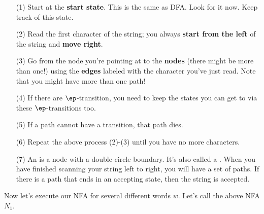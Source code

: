 \begin{itemize}
  \item[(1)] Start at the \textbf{start state}.
   This is the same as DFA. Look for it now. Keep track of this
   state.
 \item[(2)] Read the first character of the string; you always
 \textbf{start from the left} of the string and
 \textbf{move right}.
 \item[(3)] Go from the node you're pointing at to the
 \textbf{nodes}
 (there might be more than one!)
 using
 the \textbf{edges} labeled with the character you've just read.
 Note that you might have more than one path!
 \item[(4)] If there are $\ep$-transition, you need to keep the
  states
 you can get to via these $\ep$-transitions too.
 \item[(5)] If a path cannot have a transition, that path dies.
 \item[(6)] Repeat the above process (2)-(3) until you have no more characters.
 \item[(7)]
   An
   is a node with a double-circle boundary.
   It's also called a
   .
   When you have finished scanning your string left to right,
   you will have a set of paths.
   If there is a path that ends in an accepting state, then the
   string is accepted.
\end{itemize}


Now let's execute our NFA for several different words $w$. 
Let's call the above NFA $N_1$.

\begin{center}
\end{center}


